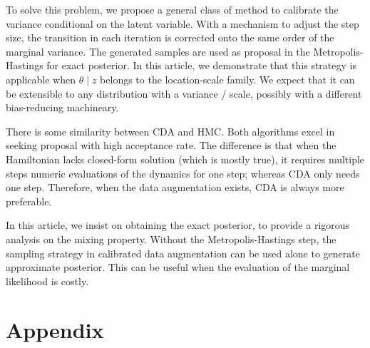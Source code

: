 \documentclass[10pt]{article}
\begin{document}
To solve this problem, we propose a general class of method to calibrate the variance conditional on the latent variable. With a mechanism to adjust the step size, the transition in each iteration is corrected onto the same order of the marginal variance. The generated samples are used as proposal in the Metropolis-Hastings for exact posterior. In this article, we demonstrate that this strategy is applicable when $\theta \mid z$ belongs to the location-scale family. We expect that it can be extensible to any distribution with a variance / scale, possibly with a different bias-reducing machineary.

There is some similarity between CDA and HMC. Both algorithms excel in seeking proposal with high acceptance rate. The difference is that when the Hamiltonian lacks  closed-form solution (which is mostly true), it requires multiple steps numeric evaluations of the dynamics for one step; whereas CDA only needs one step. Therefore, when the data augmentation exists, CDA is always more preferable.

In this article, we insist on obtaining the exact posterior, to provide a rigorous analysis on the mixing property. Without the Metropolis-Hastings step, the sampling strategy in calibrated data augmentation can be used alone to generate approximate posterior. This can be useful when the evaluation of the marginal likelihood is costly. 





\section{Appendix}
\end{document}

